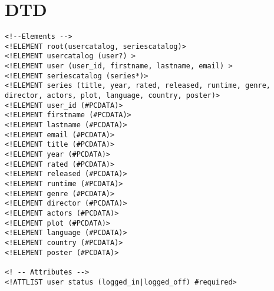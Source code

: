 \section{DTD}
\begin{lstlisting}
<!--Elements -->
<!ELEMENT root(usercatalog, seriescatalog)>
<!ELEMENT usercatalog (user?) >
<!ELEMENT user (user_id, firstname, lastname, email) >
<!ELEMENT seriescatalog (series*)>
<!ELEMENT series (title, year, rated, released, runtime, genre, director, actors, plot, language, country, poster)>
<!ELEMENT user_id (#PCDATA)>
<!ELEMENT firstname (#PCDATA)>
<!ELEMENT lastname (#PCDATA)>
<!ELEMENT email (#PCDATA)>
<!ELEMENT title (#PCDATA)>
<!ELEMENT year (#PCDATA)>
<!ELEMENT rated (#PCDATA)>
<!ELEMENT released (#PCDATA)>
<!ELEMENT runtime (#PCDATA)>
<!ELEMENT genre (#PCDATA)>
<!ELEMENT director (#PCDATA)>
<!ELEMENT actors (#PCDATA)>
<!ELEMENT plot (#PCDATA)>
<!ELEMENT language (#PCDATA)>
<!ELEMENT country (#PCDATA)>
<!ELEMENT poster (#PCDATA)>

<! -- Attributes -->
<!ATTLIST user status (logged_in|logged_off) #required>
\end{lstlisting}
